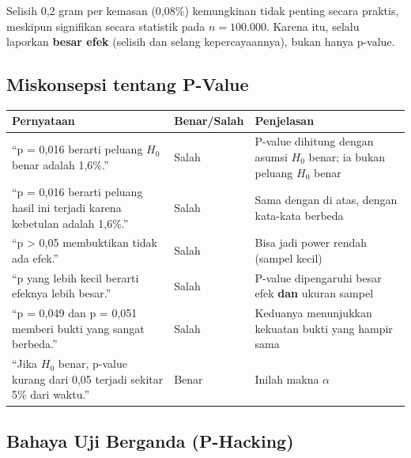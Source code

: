 \documentclass[
  indonesian,
  letterpaper,
]{book}
\newcounter{none} %
\begin{document}
Selisih 0,2 gram per kemasan (0,08\%) kemungkinan tidak penting secara
praktis, meskipun signifikan secara statistik pada \(n = 100.000\).
Karena itu, selalu laporkan \textbf{besar efek} (selisih dan selang
kepercayaannya), bukan hanya p-value.

\subsection{Miskonsepsi tentang
P-Value}\label{miskonsepsi-tentang-p-value}

{\def\LTcaptype{none} %
\begin{longtable}[]{@{}
  >{\raggedright\arraybackslash}p{}
  >{\raggedright\arraybackslash}p{}
  >{\raggedright\arraybackslash}p{}@{}}
\toprule\noalign{}
\begin{minipage}[b]{\linewidth}\raggedright
Pernyataan
\end{minipage} & \begin{minipage}[b]{\linewidth}\raggedright
Benar/Salah
\end{minipage} & \begin{minipage}[b]{\linewidth}\raggedright
Penjelasan
\end{minipage} \\
\midrule\noalign{}
\endhead
\bottomrule\noalign{}
\endlastfoot
``p = 0,016 berarti peluang \(H_0\) benar adalah 1,6\%.'' & Salah &
P-value dihitung dengan asumsi \(H_0\) benar; ia bukan peluang \(H_0\)
benar \\
``p = 0,016 berarti peluang hasil ini terjadi karena kebetulan adalah
1,6\%.'' & Salah & Sama dengan di atas, dengan kata-kata berbeda \\
``p \textgreater{} 0,05 membuktikan tidak ada efek.'' & Salah & Bisa
jadi power rendah (sampel kecil) \\
``p yang lebih kecil berarti efeknya lebih besar.'' & Salah & P-value
dipengaruhi besar efek \textbf{dan} ukuran sampel \\
``p = 0,049 dan p = 0,051 memberi bukti yang sangat berbeda.'' & Salah &
Keduanya menunjukkan kekuatan bukti yang hampir sama \\
``Jika \(H_0\) benar, p-value kurang dari 0,05 terjadi sekitar 5\% dari
waktu.'' & Benar & Inilah makna \(\alpha\) \\
\end{longtable}
}

\subsection{Bahaya Uji Berganda
(P-Hacking)}\label{bahaya-uji-berganda-p-hacking}
\end{document}
